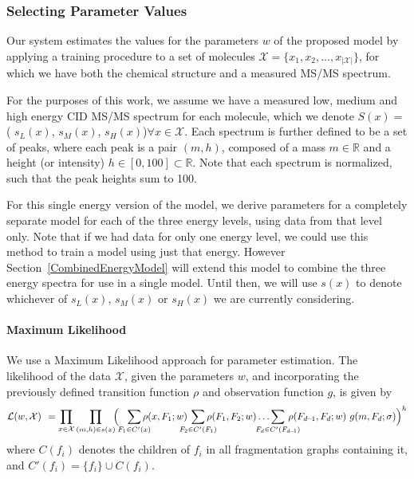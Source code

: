 \subsubsection{Selecting Parameter Values}
\label{SimpleSelectingParams}

Our system estimates the values for the parameters $w$ of the proposed model by applying a training procedure to a set of molecules $\mathcal{X} = \{x_{1},x_{2},\dots,x_{|\mathcal{X}|}\}$, for which we have both the chemical structure and a measured MS/MS spectrum. 

For the purposes of this work, we assume we have a measured low, medium and high energy CID MS/MS spectrum for each molecule, which we denote  
$S(x) = $( $s_{L}(x)$, $s_{M}(x)$, $s_{H}(x)$)$ \forall x\in\mathcal{X}.$ 
Each spectrum is further defined to be a set of peaks, where each peak is a pair $(m,h)$, composed of a mass $m \in \mathbb{R}$ and a height (or intensity) $h \in [0,100] \subset \mathbb{R}$. Note that each spectrum is normalized, such that the peak heights sum to 100.

For this single energy version of the model, we derive parameters for a completely separate model for each of the three energy levels, using data from that level only.
Note that if we had data for only one energy level, we could use this method to train a model using just that energy. 
However Section~\ref{CombinedEnergyModel} will extend this model to combine the three energy spectra for use in a single model. 
Until then, we will use $s(x)$ to denote whichever of $s_{L}(x)$, $s_{M}(x)$ or $s_{H}(x)$ we are currently considering.

\paragraph{Maximum Likelihood}
We use a Maximum Likelihood approach for parameter estimation.
The likelihood of the data $\mathcal{X}$, given the parameters $w$,  
and incorporating the previously defined transition function $\rho$ and observation function $g$, is given by
\begin{equation}
\mathcal{L}(w , \mathcal{X}) 
 \hspace{4pt}=\prod\limits_{x \in \mathcal{X}}\prod\limits_{(m,h) \in s(x)}\hspace{-4pt}\Big(\hspace{-3pt}\sum\limits_{F_{1}\in C'(x)}\hspace{-10pt} \rho( x,F_{1}; w)\hspace{-10pt} \sum\limits_{F_{2}\in C'(F_{1})}\hspace{-12pt} \rho( F_{1},F_{2}; w)   
 \dots\hspace{-16pt}\sum\limits_{F_{d}\in C'(F_{d\hspace{-1pt}-\hspace{-1pt}1})}\hspace{-14pt}\rho( F_{d\hspace{-1pt}-\hspace{-1pt}1},F_{d}; w)\text{ }g(m,F_{d}; \sigma)\Big)^{h}
\end{equation}
where $C(f_{i})$ denotes the children of $f_{i}$ in all fragmentation graphs containing it, and $C'(f_{i}) = \{f_{i}\} \cup C(f_{i})$.

